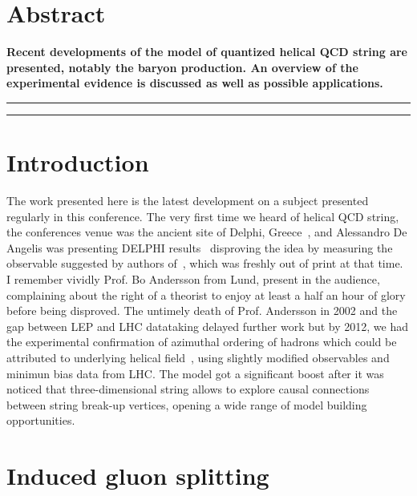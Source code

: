\documentclass[Physsubmission, Phys]{SciPost}
\begin{document}
\section*{Abstract}
{\bf
Recent developments of the model of quantized helical QCD string
are presented, notably the baryon production. An overview
of the experimental evidence is discussed as well as possible applications.
}


\vspace{10pt}
\noindent\rule{\textwidth}{1pt}
\tableofcontents\thispagestyle{fancy}
\noindent\rule{\textwidth}{1pt}
\vspace{10pt}


\section{Introduction}
\label{sec:intro}
 The work presented here is the latest development on a subject
 presented regularly in this conference. The very first time we heard of helical QCD string, the
 conferences venue was the ancient site of Delphi, Greece~\cite{ismd_delphi}, and
 Alessandro De Angelis was presenting DELPHI results~\cite{delphi_screwiness} disproving
 the idea by measuring the observable suggested by authors of~\cite{lund_helix}, which was freshly out of print at that time.
 I remember vividly Prof. Bo Andersson from Lund, present in the
 audience, complaining about the right of a theorist to enjoy at least
 a half an hour of glory before being disproved. The untimely death
 of Prof. Andersson in 2002 and the gap between LEP and LHC datataking
 delayed further work but by 2012, we had the experimental
 confirmation of azimuthal ordering of hadrons which could be attributed
 to underlying helical field~\cite{ATLAS-AO}, using slightly modified
 observables and minimun bias data from LHC. The model got a
 significant boost after it was noticed that three-dimensional string
 allows to explore causal connections between string break-up
 vertices, opening a wide range of model building opportunities\cite{qhelix}.

\section{Induced gluon splitting} 
    
\end{document}
